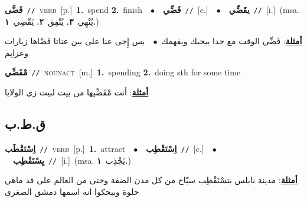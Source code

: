 \documentclass[10pt,a4paper,twoside]{article} %
\begin{document}
\begin{multicols}{2}
{\setlength\topsep{0pt}\textbf{\foreignlanguage{arabic}{قَضَّى}}\ {\color{gray}\texttt{//}\color{black}}\ \textsc{verb}\ [p.]\ \textbf{1.}~spend  \textbf{2.}~finish\ \ $\bullet$\ \ \setlength\topsep{0pt}\textbf{\foreignlanguage{arabic}{قَضِّي}}\ {\color{gray}\texttt{//}\color{black}}\ [c.]\ \ $\bullet$\ \ \setlength\topsep{0pt}\textbf{\foreignlanguage{arabic}{يقَضِّي}}\ {\color{gray}\texttt{//}\color{black}}\ [i.]\ \color{gray}(msa. \foreignlanguage{arabic}{يُنْهِي}~\foreignlanguage{arabic}{\textbf{٣.}}  \foreignlanguage{arabic}{يُنْفِق}~\foreignlanguage{arabic}{\textbf{٢.}}  \foreignlanguage{arabic}{يَقْضِي}~\foreignlanguage{arabic}{\textbf{١.}})\color{black}\  \begin{flushright}\color{gray}\foreignlanguage{arabic}{\textbf{\underline{\foreignlanguage{arabic}{أمثلة}}}: قَضِّي الوقت مع حدا بيحبك ويفهمك\ $\bullet$\ \  بس إِجى عنا على بين عناتا قَضّاها زيارات وعزايِم}\end{flushright}\color{black}} \vspace{2mm}

{\setlength\topsep{0pt}\textbf{\foreignlanguage{arabic}{مْقَضِّي}}\ {\color{gray}\texttt{//}\color{black}}\ \textsc{noun\textunderscore act}\ [m.]\ \textbf{1.}~spending  \textbf{2.}~doing sth for some time\  \begin{flushright}\color{gray}\foreignlanguage{arabic}{\textbf{\underline{\foreignlanguage{arabic}{أمثلة}}}: أنت مْقَضِّيها من بيت لبيت زي الولايا}\end{flushright}\color{black}} \vspace{2mm}

\vspace{-3mm}
\subsection*{\color{blue}\foreignlanguage{arabic}{ق.ط.ب}\color{blue}{}} 

{\setlength\topsep{0pt}\textbf{\foreignlanguage{arabic}{اِسْتَقْطَب}}\ {\color{gray}\texttt{//}\color{black}}\ \textsc{verb}\ [p.]\ \textbf{1.}~attract\ \ $\bullet$\ \ \setlength\topsep{0pt}\textbf{\foreignlanguage{arabic}{اِسْتَقْطِب}}\ {\color{gray}\texttt{//}\color{black}}\ [c.]\ \ $\bullet$\ \ \setlength\topsep{0pt}\textbf{\foreignlanguage{arabic}{يِسْتَقْطِب}}\ {\color{gray}\texttt{//}\color{black}}\ [i.]\ \color{gray}(msa. \foreignlanguage{arabic}{يَجْذِب}~\foreignlanguage{arabic}{\textbf{١.}})\color{black}\  \begin{flushright}\color{gray}\foreignlanguage{arabic}{\textbf{\underline{\foreignlanguage{arabic}{أمثلة}}}: مدينة نابلس بتسْتَقْطِب سيّاح من كل مدن الضفة وحتى من العالم على قد ماهي حلوة وبيحكوا انه اسمها دمشق الصغرى}\end{flushright}\color{black}} \vspace{2mm}


\end{multicols}
\end{document}
